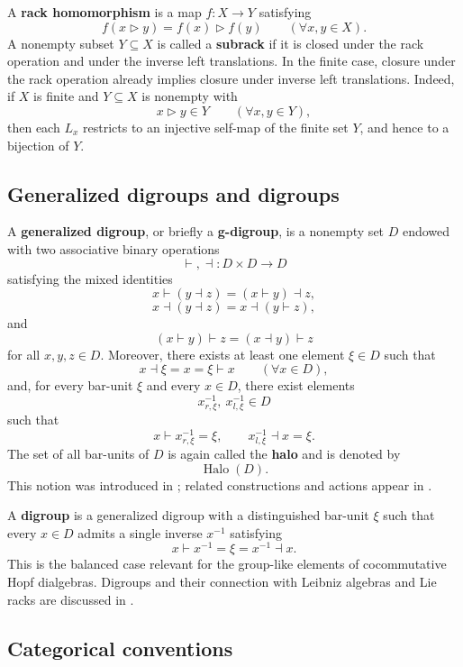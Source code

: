 \documentclass[11pt]{article}
\theoremstyle{plain}
\theoremstyle{definition}
\theoremstyle{remark}
\DeclareMathOperator{\Halo}{Halo}
\begin{document}
	A \textbf{rack homomorphism} is a map \(f:X\to Y\) satisfying
	\[
	f(x\triangleright y)=f(x)\triangleright f(y)
	\qquad
	(\forall x,y\in X).
	\]
	A nonempty subset \(Y\subseteq X\) is called a \textbf{subrack} if it is closed
	under the rack operation and under the inverse left translations. In the finite
	case, closure under the rack operation already implies closure under inverse
	left translations. Indeed, if \(X\) is finite and \(Y\subseteq X\) is nonempty
	with
	\[
	x\triangleright y\in Y
	\qquad
	(\forall x,y\in Y),
	\]
	then each \(L_x\) restricts to an injective self-map of the finite set \(Y\),
	and hence to a bijection of \(Y\).
	
	\subsection{Generalized digroups and digroups}
	
	A \textbf{generalized digroup}, or briefly a \textbf{g-digroup}, is a nonempty
	set \(D\) endowed with two associative binary operations
	\[
	\vdash,\dashv:D\times D\longrightarrow D
	\]
	satisfying the mixed identities
	\[
	x\vdash(y\dashv z)=(x\vdash y)\dashv z,
	\]
	\[
	x\dashv(y\dashv z)=x\dashv(y\vdash z),
	\]
	and
	\[
	(x\vdash y)\vdash z=(x\dashv y)\vdash z
	\]
	for all \(x,y,z\in D\). Moreover, there exists at least one element
	\(\xi\in D\) such that
	\[
	x\dashv \xi=x=\xi\vdash x
	\qquad
	(\forall x\in D),
	\]
	and, for every bar-unit \(\xi\) and every \(x\in D\), there exist elements
	\[
	x^{-1}_{r,\xi},\ x^{-1}_{l,\xi}\in D
	\]
	such that
	\[
	x\vdash x^{-1}_{r,\xi}=\xi,
	\qquad
	x^{-1}_{l,\xi}\dashv x=\xi.
	\]
	The set of all bar-units of \(D\) is again called the \textbf{halo} and is
	denoted by
	\[
	\Halo(D).
	\]
	This notion was introduced in \cite[Section~2]{SVW}; related constructions and
	actions appear in \cite[Section~2]{RSV}.
	
	A \textbf{digroup} is a generalized digroup with a distinguished bar-unit
	\(\xi\) such that every \(x\in D\) admits a single inverse \(x^{-1}\) satisfying
	\[
	x\vdash x^{-1}=\xi=x^{-1}\dashv x.
	\]
	This is the balanced case relevant for the group-like elements of
	cocommutative Hopf dialgebras. Digroups and their connection with Leibniz
	algebras and Lie racks are discussed in \cite[Section~2]{Kinyon}.
	
	\subsection{Categorical conventions}
	
\end{document}
